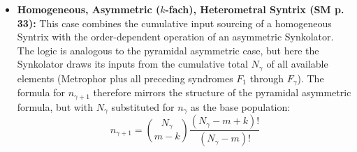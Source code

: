 \documentclass[12pt]{article}
\newcommand{\synkolationsstufe}{m}
\newcommand{\syndrom}{F}
\begin{document}
\begin{itemize}
    \item \textbf{Homogeneous, Asymmetric (\( k \)-fach), Heterometral Syntrix (SM p. 33):}
    This case combines the cumulative input sourcing of a homogeneous Syntrix with the order-dependent operation of an asymmetric Synkolator. The logic is analogous to the pyramidal asymmetric case, but here the Synkolator draws its inputs from the cumulative total \( N_\gamma \) of all available elements (Metrophor plus all preceding syndromes \( \syndrom_1 \) through \( \syndrom_\gamma \)). The formula for \( n_{\gamma+1} \) therefore mirrors the structure of the pyramidal asymmetric formula, but with \( N_\gamma \) substituted for \( n_\gamma \) as the base population:
    \begin{equation*}
    n_{\gamma+1} = \binom{N_\gamma}{\synkolationsstufe-k} \frac{(N_\gamma-\synkolationsstufe+k)!}{(N_\gamma-\synkolationsstufe)!}
    \end{equation*}


\end{itemize}
\end{document}
